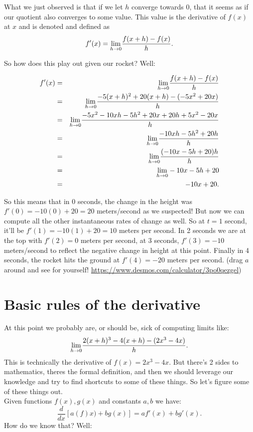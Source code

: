 What we just observed is that if we let $h$ converge towards 0, that it seems as if our quotient also converges to some value.  This value is the derivative of $f(x)$ at $x$ and is denoted and defined as $$f'(x)=\displaystyle{ \lim_{h \to 0}}\frac{f(x+h)-f(x)}{h}.$$

So how does this play out given our rocket?  Well:

\begin{eqnarray*}
f'(x)&=&\displaystyle{ \lim_{h \to 0}}\frac{f(x+h)-f(x)}{h}\\
&=&\displaystyle{ \lim_{h \to 0}} \frac{-5(x+h)^2+20(x+h)-(-5x^2+20x)}{h}\\
&=&\displaystyle{ \lim_{h \to 0}}\frac{-5x^2-10xh-5h^2+20x+20h+5x^2-20x}{h}\\
&=&\displaystyle{ \lim_{h \to 0}}\frac{-10xh-5h^2+20h}{h}\\
&=&\displaystyle{ \lim_{h \to 0}}\frac{(-10x-5h+20)h}{h}\\
&=&\displaystyle{ \lim_{h \to 0}} -10x-5h+20\\
&=&-10x+20.
\end{eqnarray*}


So this means that in $0$ seconds, the change in the height was $f'(0)=-10(0)+20=20$ meters/second as we suspected!  But now we can compute all the other instantaneous rates of change as well.  So at $t=1$ second, it'll be $f'(1)=-10(1)+20=10$ meters per second.  In 2 seconds we are at the top with $f'(2)=0$ meters per second, at 3 seconds, $f'(3)=-10$ meters/second to reflect the negative change in height at this point.  Finally in 4 seconds, the rocket hits the ground at $f'(4)=-20$ meters per second.  (drag $a$ around and see for yourself! \url{https://www.desmos.com/calculator/3po0qezgel})




\section{Basic rules of the derivative}\label{Section:RulesofDerivative}

At this point we probably are, or should be, sick of computing limits like: $$\displaystyle{ \lim_{h \to 0}}\frac{2(x+h)^3-4(x+h)-(2x^3-4x)}{h}.$$  This is technically the derivative of $f(x)=2x^3-4x$.  But there's 2 sides to mathematics, theres the formal definition, and then we should leverage our knowledge and try to find shortcuts to some of these things.  So let's  figure some of these things out.\\

Given functions $f(x), g(x)$ and constants $a,b$ we have: $$\frac{d}{dx}[a(f)x)+bg(x)]=af'(x)+bg'(x).$$  How do we know that?  Well:

